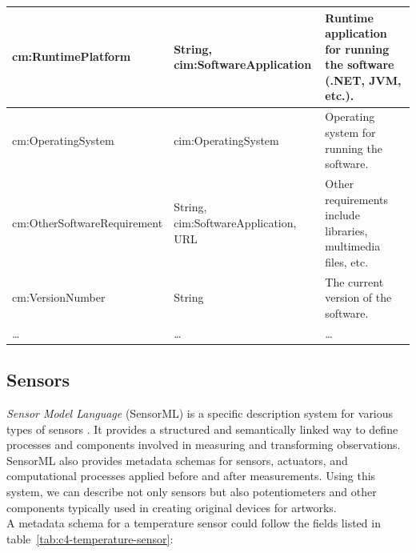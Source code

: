 \begin{longtable}{|p{}|p{}|p{}|}
    \hline
    \scriptsize cm:RuntimePlatform                    & \scriptsize String, \textcolor{uniudColor3}{cim:SoftwareApplication} & \scriptsize Runtime application for running the software (.NET, JVM, etc.). \\
    \hline
    \scriptsize cm:OperatingSystem                    & \scriptsize \textcolor{uniudColor3}{cim:OperatingSystem}            & \scriptsize Operating system for running the software. \\
    \hline
    \scriptsize cm:OtherSoftwareRequirement           & \scriptsize String, \textcolor{uniudColor3}{cim:SoftwareApplication}, URL & \scriptsize Other requirements include libraries, multimedia files, etc. \\
    \hline
    \scriptsize cm:VersionNumber                      & \scriptsize String                         & \scriptsize The current version of the software. \\
    \hline
    \scriptsize …                                     & \scriptsize …                              & \scriptsize … \\
    \hline

\end{longtable}

\subsection{Sensors}
\textit{Sensor Model Language} (SensorML) is a specific description system for various types of sensors \cite{SensorML}. It provides a structured and semantically linked way to define processes and components involved in measuring and transforming observations. SensorML also provides metadata schemas for sensors, actuators, and computational processes applied before and after measurements. Using this system, we can describe not only sensors but also potentiometers and other components typically used in creating original devices for artworks.\\
A metadata schema for a temperature sensor could follow the fields listed in table~\ref{tab:c4-temperature-sensor}:


